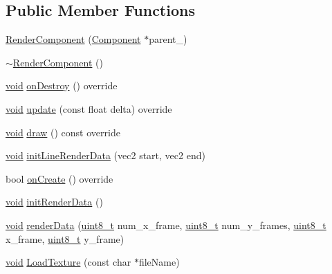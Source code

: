 \subsection*{Public Member Functions}
\begin{DoxyCompactItemize}
\item 
\hyperlink{classRenderComponent_a24b1eded43130d0dcb0bb7e4796983c3}{Render\+Component} (\hyperlink{classComponent}{Component} $\ast$parent\+\_\+)
\item 
\hyperlink{classRenderComponent_a16bab40295123b9ea802d7e85b14a884}{$\sim$\+Render\+Component} ()
\item 
\hyperlink{imgui__impl__opengl3__loader_8h_ac668e7cffd9e2e9cfee428b9b2f34fa7}{void} \hyperlink{classRenderComponent_a2d05ddd16edf5d2022d46a640a74a4da}{on\+Destroy} () override
\item 
\hyperlink{imgui__impl__opengl3__loader_8h_ac668e7cffd9e2e9cfee428b9b2f34fa7}{void} \hyperlink{classRenderComponent_a93203c887b05a024f70f30e8a71576bd}{update} (const float delta) override
\item 
\hyperlink{imgui__impl__opengl3__loader_8h_ac668e7cffd9e2e9cfee428b9b2f34fa7}{void} \hyperlink{classRenderComponent_af2bf016f9a929d97b4c0c31db8e3842f}{draw} () const override
\item 
\hyperlink{imgui__impl__opengl3__loader_8h_ac668e7cffd9e2e9cfee428b9b2f34fa7}{void} \hyperlink{classRenderComponent_a24db61b2e418c298a489c7c04cdb4c97}{init\+Line\+Render\+Data} (vec2 start, vec2 end)
\item 
bool \hyperlink{classRenderComponent_a5ecc72f2a9249c4df22365dbe7ca49b0}{on\+Create} () override
\item 
\hyperlink{imgui__impl__opengl3__loader_8h_ac668e7cffd9e2e9cfee428b9b2f34fa7}{void} \hyperlink{classRenderComponent_aa57b7f23b20116d123538e236b9ed388}{init\+Render\+Data} ()
\item 
\hyperlink{imgui__impl__opengl3__loader_8h_ac668e7cffd9e2e9cfee428b9b2f34fa7}{void} \hyperlink{classRenderComponent_afdeec83350ada025d9e447ac57c86f78}{render\+Data} (\hyperlink{stdint_8h_aba7bc1797add20fe3efdf37ced1182c5}{uint8\+\_\+t} num\+\_\+x\+\_\+frame, \hyperlink{stdint_8h_aba7bc1797add20fe3efdf37ced1182c5}{uint8\+\_\+t} num\+\_\+y\+\_\+frames, \hyperlink{stdint_8h_aba7bc1797add20fe3efdf37ced1182c5}{uint8\+\_\+t} x\+\_\+frame, \hyperlink{stdint_8h_aba7bc1797add20fe3efdf37ced1182c5}{uint8\+\_\+t} y\+\_\+frame)
\item 
\hyperlink{imgui__impl__opengl3__loader_8h_ac668e7cffd9e2e9cfee428b9b2f34fa7}{void} \hyperlink{classRenderComponent_a62bf78722e9498c3c25f99d294325393}{Load\+Texture} (const char $\ast$file\+Name)

\end{DoxyCompactItemize}

